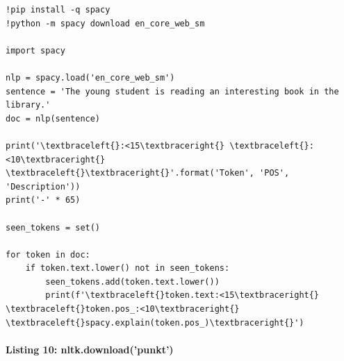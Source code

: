\documentclass[12pt,a4paper,oneside]{report}
\begin{document}
\begin{Verbatim}[commandchars=\\\{\},breaklines=true,breakanywhere=true,fontsize=\scriptsize,frame=leftline,framesep=2mm,rulecolor=\color{gray}]
!pip install -q spacy
!python -m spacy download en_core_web_sm

import spacy

nlp = spacy.load('en_core_web_sm')
sentence = 'The young student is reading an interesting book in the library.'
doc = nlp(sentence)

print('\textbraceleft{}:<15\textbraceright{} \textbraceleft{}:<10\textbraceright{} \textbraceleft{}\textbraceright{}'.format('Token', 'POS', 'Description'))
print('-' * 65)

seen_tokens = set()

for token in doc:
    if token.text.lower() not in seen_tokens:
        seen_tokens.add(token.text.lower())
        print(f'\textbraceleft{}token.text:<15\textbraceright{} \textbraceleft{}token.pos_:<10\textbraceright{} \textbraceleft{}spacy.explain(token.pos_)\textbraceright{}')
\end{Verbatim}
\paragraph{Listing 10: nltk.download('punkt')}\mbox{}\\[-1ex]
\end{document}
